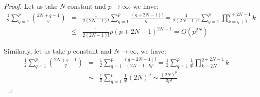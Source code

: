 \begin{proof}
    Let us take $N$ constant and $p \rightarrow \infty$, we have:
    \begin{eqnarray}
        \frac{1}{2} \sum_{q=1}^p \binom{2N+q-1}{q} &=& \frac{1}{2 (2 N - 1)!} \sum_{q = 1}^p \frac{(q + 2N-1)!}{q!} = \frac{1}{2 (2 N - 1)!} \sum_{q = 1}^p \prod_{k=q+1}^{q + 2N-1} k\nonumber\\ &\le& \frac{1}{2 (2 N - 1)!} p (p+2N-1)^{2N-1} = O(p^{2 N})
    \end{eqnarray}

    Similarly, let us take $p$ constant and $N \rightarrow \infty$, we have:
    \begin{eqnarray}
        \frac{1}{2} \sum_{q=1}^p \binom{2N+q-1}{q} &=& \frac{1}{2} \sum_{q = 1}^p \frac{(q + 2N-1)!}{(2 N - 1)! q!} = \frac{1}{2} \sum_{q = 1}^p \frac{1}{q!} \prod_{k=2N}^{q + 2N-1} k\nonumber\\ &\sim& \frac{1}{2} \sum_{q = 1}^p \frac{1}{q!} (2 N)^q \sim \frac{(2 N)^p}{2 p!}
    \end{eqnarray}
\end{proof}

